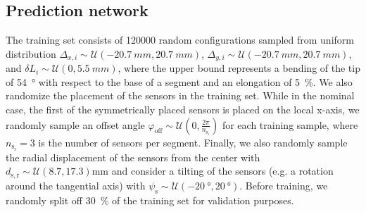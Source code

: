 %

\subsection{Prediction network}\label{sub:promasens:pcc_simulations:neural_network}
The training set consists of \SI{120000}{} random configurations sampled from uniform distribution $\Delta_{x,i} \sim \mathcal{U}(-\SI{20.7}{mm}, \SI{20.7}{mm})$, $\Delta_{y,i} \sim \mathcal{U}(-\SI{20.7}{mm}, \SI{20.7}{mm})$, and $\delta L_i \sim \mathcal{U}(0, \SI{5.5}{mm})$, where the upper bound represents a bending of the tip of \SI{54}{\degree} with respect to the base of a segment and an elongation of \SI{5}{\percent}. We also randomize the placement of the sensors in the training set. While in the nominal case, the first of the symmetrically placed sensors is placed on the local x-axis, we randomly sample an offset angle $\varphi_\mathrm{off} \sim \mathcal{U}(0, \frac{2\pi}{n_{\mathrm{s}_i}})$ for each training sample, where $n_{\mathrm{s}_i} = 3$ is the number of sensors per segment.
Finally, we also randomly sample the radial displacement of the sensors from the center with $d_{\mathrm{s}, \mathrm{r}} \sim \mathcal{U}(8.7, 17.3) \mathrm{mm}$ and consider a tilting of the sensors (e.g. a rotation around the tangential axis) with $\psi_\mathrm{s} \sim \mathcal{U}(\SI{-20}{\degree}, \SI{20}{\degree})$.
Before training, we randomly split off \SI{30}{\percent} of the training set for validation purposes.

